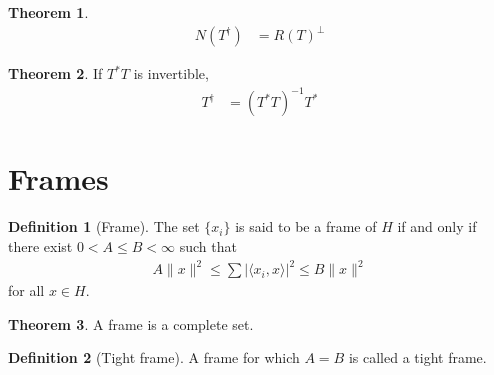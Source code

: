 \documentclass[titlepage, fleqn, a4paper, 12pt, twoside]{article}
\theoremstyle{definition}
\newtheorem{definition}{Definition}
\theoremstyle{theorem}
\newtheorem{theorem}{Theorem}
\begin{document}
\begin{theorem}
	\begin{align*}
		N\left( T^{\dagger} \right) &= R(T)^{\perp}
	\end{align*}
\end{theorem}

\begin{theorem}
	If $T^* T$ is invertible,
	\begin{align*}
		T^{\dagger} &= \left( T^* T \right)^{-1} T^*
	\end{align*}
\end{theorem}

\section{Frames}

\begin{definition}[Frame]
	The set $\{x_i\}$ is said to be a frame of $H$ if and only if there exist $0 < A \le B < \infty$ such that
	\begin{eqnarray*}
		A \|x\|^2 \le \sum \left| \langle x_i,x \rangle \right|^2 \le B \|x\|^2
	\end{eqnarray*}
	for all $x \in H$.
\end{definition}

\begin{theorem}
	A frame is a complete set.
\end{theorem}

\begin{definition}[Tight frame]
	A frame for which $A = B$ is called a tight frame.
\end{definition}
\end{document}
